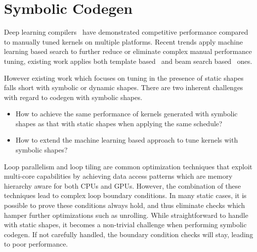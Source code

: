 \section{Symbolic Codegen}
\label{sec:compliation:codegen}
Deep learning compilers~\citep{tvm_osdi18, halide} have demonstrated competitive performance compared to manually tuned kernels on multiple platforms. Recent trends apply machine learning based search to further reduce or eliminate complex manual performance tuning, existing work applies both template based~\citep{chen2018learning, zheng2020flextensor} and beam search based~\citep{adams2019learning} ones.

However existing work which focuses on tuning in the presence of static shapes falls short with symbolic or dynamic shapes. There are two inherent challenges with regard to codegen with symbolic shapes.
\begin{itemize}
    \itemsep 0em
    \item How to achieve the same performance of kernels generated with symbolic shapes as that with static shapes when applying the same schedule?
    \item How to extend the machine learning based approach to tune kernels with symbolic shapes?
\end{itemize}

Loop parallelism and loop tiling are common optimization techniques that exploit multi-core capabilities by achieving data access patterns which are memory hierarchy aware for both CPUs and GPUs. However, the combination of these techniques lead to complex loop boundary conditions. In many static cases, it is possible to prove these conditions always hold, and thus eliminate checks which hamper further optimizations such as unrolling.
While straightforward to handle with static shapes, it becomes a non-trivial challenge when performing symbolic codegen. If not carefully handled, the boundary condition checks will stay, leading to poor performance.

